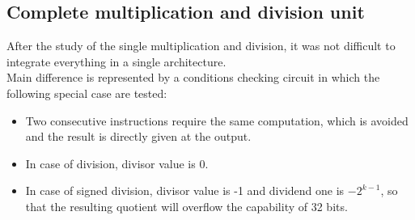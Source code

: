 \subsection{Complete multiplication and division unit}
After the study of the single multiplication and division, it was not difficult to integrate everything in a single architecture.\\
Main difference is represented by a conditions checking circuit in which the following special case are tested:
\begin{itemize}
    \item Two consecutive instructions require the same computation, which is avoided and the result is directly given at the output.
    \item In case of division, divisor value is 0.
    \item In case of signed division, divisor value is -1 and dividend one is $-2^{k-1}$, so that the resulting quotient will overflow the capability of 32 bits.
\end{itemize}
